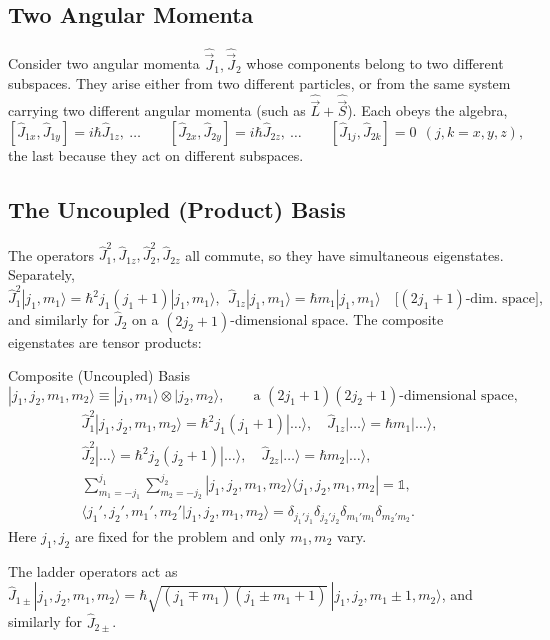 \documentclass[11pt,a4paper]{article}
\begin{document}
\subsection{Two Angular Momenta}
Consider two angular momenta $\hat{\vec J}_1,\hat{\vec J}_2$ whose components belong to two different subspaces. They arise either from two different particles, or from the same system carrying two different angular momenta (such as $\hat{\vec L}+\hat{\vec S}$). Each obeys the algebra,
\[
[\hat J_{1x},\hat J_{1y}]=i\hbar\hat J_{1z},\ \dots\qquad [\hat J_{2x},\hat J_{2y}]=i\hbar\hat J_{2z},\ \dots\qquad [\hat J_{1j},\hat J_{2k}]=0\ \ (j,k=x,y,z),
\]
the last because they act on different subspaces.

\subsection{The Uncoupled (Product) Basis}
The operators $\hat J_1^2,\hat J_{1z},\hat J_2^2,\hat J_{2z}$ all commute, so they have simultaneous eigenstates. Separately,
\[
\hat J_1^2|j_1,m_1\rangle=\hbar^2j_1(j_1+1)|j_1,m_1\rangle,\ \ \hat J_{1z}|j_1,m_1\rangle=\hbar m_1|j_1,m_1\rangle\quad\big[(2j_1+1)\text{-dim.\ space}\big],
\]
and similarly for $\hat J_2$ on a $(2j_2+1)$-dimensional space. The composite eigenstates are tensor products:

\begin{thm}{Composite (Uncoupled) Basis}
\[
|j_1,j_2,m_1,m_2\rangle\equiv|j_1,m_1\rangle\otimes|j_2,m_2\rangle,\qquad\text{a }(2j_1+1)(2j_2+1)\text{-dimensional space,}
\]
\begin{gather*}
\hat J_1^2|j_1,j_2,m_1,m_2\rangle=\hbar^2j_1(j_1+1)|\dots\rangle,\quad \hat J_{1z}|\dots\rangle=\hbar m_1|\dots\rangle,\\
\hat J_2^2|\dots\rangle=\hbar^2j_2(j_2+1)|\dots\rangle,\quad \hat J_{2z}|\dots\rangle=\hbar m_2|\dots\rangle,\\
\sum_{m_1=-j_1}^{j_1}\sum_{m_2=-j_2}^{j_2}|j_1,j_2,m_1,m_2\rangle\langle j_1,j_2,m_1,m_2|=\mathbb 1,\\
\langle j_1',j_2',m_1',m_2'|j_1,j_2,m_1,m_2\rangle=\delta_{j_1'j_1}\delta_{j_2'j_2}\delta_{m_1'm_1}\delta_{m_2'm_2}.
\end{gather*}
Here $j_1,j_2$ are fixed for the problem and only $m_1,m_2$ vary.
\end{thm}

The ladder operators act as $\hat J_{1\pm}|j_1,j_2,m_1,m_2\rangle=\hbar\sqrt{(j_1\mp m_1)(j_1\pm m_1+1)}\,|j_1,j_2,m_1\pm1,m_2\rangle$, and similarly for $\hat J_{2\pm}$.
\end{document}
